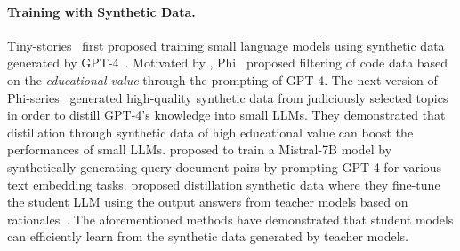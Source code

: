 \paragraph{Training with Synthetic Data.}
Tiny-stories~\cite{eldan2023tinystories} first proposed training small language models using synthetic data generated by GPT-4~\cite{achiam2023gpt}. Motivated by \cite{eldan2023tinystories}, Phi~\cite{gunasekar2023textbooks} proposed filtering of code data based on the \emph{educational value} through the prompting of GPT-4.
The next version of Phi-series~\cite{li2023textbooks, abdin2024phi} generated high-quality synthetic data from judiciously selected topics in order to distill GPT-4's knowledge into small LLMs. They demonstrated that distillation through synthetic data of high educational value can boost the performances of small LLMs. \cite{wang2023improving} proposed to train a Mistral-7B model \cite{jiang2023mistral} by synthetically generating query-document pairs by prompting GPT-4 for various text embedding tasks. 
\cite{yu2024distilling} proposed distillation synthetic data where they fine-tune the student LLM using the output answers from teacher models
based on rationales~\cite{wei2022chain, deng2023rephrase}. The aforementioned methods have demonstrated that student models can efficiently learn from the synthetic data generated by teacher models. 